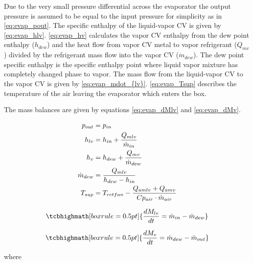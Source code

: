 \medskip
Due to the very small pressure differential across the evaporator the output pressure is assumed to be equal to the input pressure for simplicity as in \cref{eq:evap_pout}. The specific enthalpy of the liquid-vapor CV is given by \cref{eq:evap_hlv}. \cref{eq:evap_hv} calculates the vapor CV enthalpy from the dew point enthalpy ($h_{dew}$) and the heat flow from vapor CV metal to vapor refrigerant ($Q_{mv}$) divided by the refrigerant mass flow into the vapor CV ($\dot{m}_{dew}$). The dew point specific enthalpy is the specific enthalpy point where liquid vapor mixture has completely changed phase to vapor. The mass flow from the liquid-vapor CV to the vapor CV is given by \cref{eq:evap_mdot_{lv}}. \cref{eq:evap_Tsup} describes the temperature of the air leaving the evaporator which enters the box.

The mass balances are given by equations \cref{eq:evap_dMlv} and \cref{eq:evap_dMv}.

\begin{align}
	p_{out}       & = p_{in} \label{eq:evap_pout}                                                                \\
	h_{lv}        & = h_{in} + \frac{Q_{mlv}}{\dot{m}_{in}} \label{eq:evap_hlv}                                  \\
	h_v           & = h_{dew} + \frac{Q_{mv}}{\dot{m}_{dew}} \label{eq:evap_hv}                                  \\
	\dot{m}_{dew} & = \frac{Q_{mlv}}{h_{dew} - h_{in}} \label{eq:evap_mdot_{lv}}                                 \\
	T_{sup}       & = T_{retfan} -  \frac{Q_{amlv} + Q_{amv}}{Cp_{air} \cdot \dot{m}_{air}} \label{eq:evap_Tsup}
\end{align}

\begin{equation} \label{eq:evap_dMlv}
	\tcbhighmath[boxrule = 0.5pt]{\frac{dM_{lv}}{dt} = \dot{m}_{in} - \dot{m}_{dew}  }
\end{equation}

\begin{equation} \label{eq:evap_dMv}
	\tcbhighmath[boxrule = 0.5pt]{\frac{dM_v}{dt}   = \dot{m}_{dew} - \dot{m}_{out}  }
\end{equation}

where\\


